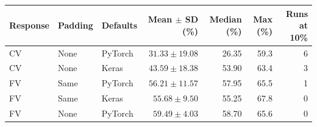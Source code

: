 \begin{tabular}{lllrrrr}
\toprule
Response & Padding & Defaults & Mean $\pm$ SD (\%) & Median (\%) & Max (\%) & Runs at 10\% \\
\midrule
CV & None & PyTorch & $31.33 \pm 19.08$ & 26.35 & 59.3 & 6 \\
CV & None & Keras & $43.59 \pm 18.38$ & 53.90 & 63.4 & 3 \\
FV & Same & PyTorch & $56.21 \pm 11.57$ & 57.95 & 65.5 & 1 \\
FV & Same & Keras & $55.68 \pm 9.50$ & 55.25 & 67.8 & 0 \\
FV & None & PyTorch & $59.49 \pm 4.03$ & 58.70 & 65.6 & 0 \\
\bottomrule
\end{tabular}
